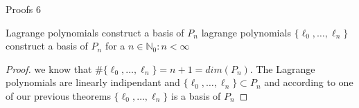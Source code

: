 \documentclass[8pt]{beamer}
\begin{document}
\begin{frame}{Proofs 6}
	\begin{theorem}{Lagrange polynomials construct a basis of $P_n$}
		lagrange polynomials $\{\ell_0,\ldots, \ell_n\}$ construct a basis of $P_n$ for a $n\in \mathbb{N}_0: n <\infty$
	\end{theorem}
	\begin{proof}
		we know that $\#\{\ell_0,\ldots, \ell_n\} = n+1 = dim(P_n)$. The Lagrange polynomials are linearly indipendant and $\{\ell_0,\ldots, \ell_n\} \subset P_n$ and according to one of our previous theorems $\{\ell_0,\ldots, \ell_n\}$ is a basis of $P_n$
	\end{proof}
	
\end{frame}
\end{document}
